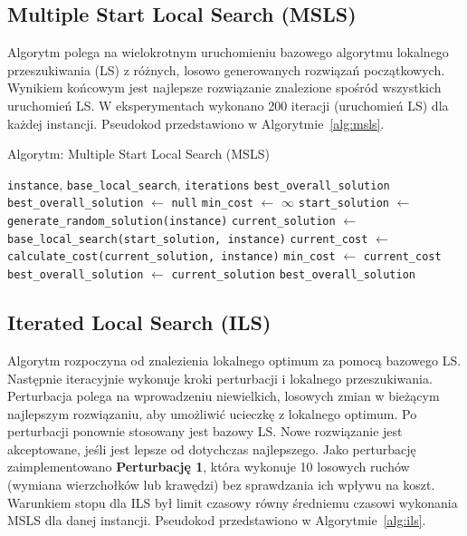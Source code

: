 \documentclass[12pt,a4paper]{article}
\begin{document}
\subsection{Multiple Start Local Search (MSLS)}
Algorytm polega na wielokrotnym uruchomieniu bazowego algorytmu lokalnego przeszukiwania (LS) z różnych, losowo generowanych rozwiązań początkowych. Wynikiem końcowym jest najlepsze rozwiązanie znalezione spośród wszystkich uruchomień LS. W eksperymentach wykonano 200 iteracji (uruchomień LS) dla każdej instancji. Pseudokod przedstawiono w Algorytmie~\ref{alg:msls}.

\begin{algorithm}[H]
\caption{Algorytm: Multiple Start Local Search (MSLS)}
\label{alg:msls}
\begin{algorithmic}[1]
\Require \texttt{instance}, \texttt{base\_local\_search}, \texttt{iterations}
\Ensure \texttt{best\_overall\_solution}
\State \texttt{best\_overall\_solution} $\leftarrow$ \texttt{null}
\State \texttt{min\_cost} $\leftarrow$ $\infty$
    \State \texttt{start\_solution} $\leftarrow$ \texttt{generate\_random\_solution(instance)}
    \State \texttt{current\_solution} $\leftarrow$ \texttt{base\_local\_search(start\_solution, instance)}
    \State \texttt{current\_cost} $\leftarrow$ \texttt{calculate\_cost(current\_solution, instance)}
        \State \texttt{min\_cost} $\leftarrow$ \texttt{current\_cost}
        \State \texttt{best\_overall\_solution} $\leftarrow$ \texttt{current\_solution}
    \EndIf
\EndFor
\State \Return \texttt{best\_overall\_solution}
\end{algorithmic}
\end{algorithm}

\subsection{Iterated Local Search (ILS)}
Algorytm rozpoczyna od znalezienia lokalnego optimum za pomocą bazowego LS. Następnie iteracyjnie wykonuje kroki perturbacji i lokalnego przeszukiwania. Perturbacja polega na wprowadzeniu niewielkich, losowych zmian w bieżącym najlepszym rozwiązaniu, aby umożliwić ucieczkę z lokalnego optimum. Po perturbacji ponownie stosowany jest bazowy LS. Nowe rozwiązanie jest akceptowane, jeśli jest lepsze od dotychczas najlepszego. Jako perturbację zaimplementowano \textbf{Perturbację 1}, która wykonuje 10 losowych ruchów (wymiana wierzchołków lub krawędzi) bez sprawdzania ich wpływu na koszt. Warunkiem stopu dla ILS był limit czasowy równy średniemu czasowi wykonania MSLS dla danej instancji. Pseudokod przedstawiono w Algorytmie~\ref{alg:ils}.
\end{document}
